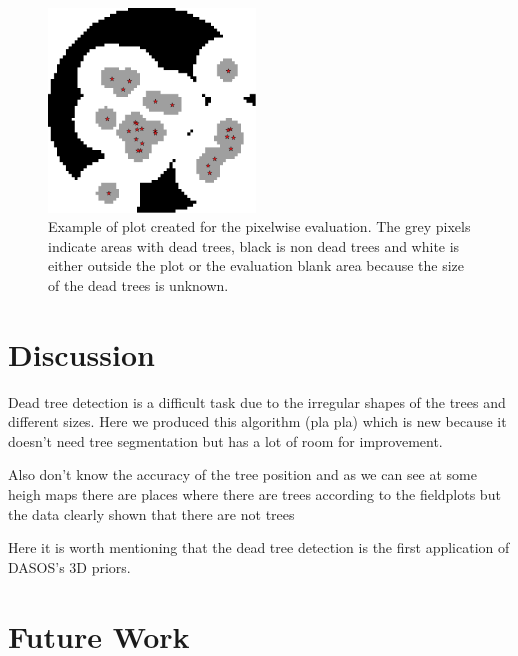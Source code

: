 \documentclass{subfiles}
\begin{document}
\begin{figure} [h!]
	\centering
	\includegraphics[width=0.49\textwidth]{img/dead/results/PixewiseEvaluationPlot}
	\caption{Example of plot created for the pixelwise evaluation. The grey pixels indicate areas with dead trees, black is non dead trees and white is either outside the plot or the evaluation blank area because the size of the dead trees is unknown.}
	\label{fig:Pixelwise_evaluation_plot}
\end{figure}


		
\section{Discussion}

\par Dead tree detection is a difficult task due to the irregular shapes of the trees and different sizes. Here we produced this algorithm (pla pla) which is new because it doesn't need tree segmentation but has a lot of room for improvement. 

Also don't know the accuracy of the tree position and as we can see at some heigh maps there are places where there are trees according to the fieldplots but the data clearly shown that there are not trees



\par Here it is worth mentioning that the dead tree detection is the first application of DASOS's 3D priors. 

\section{Future Work}
\end{document}

